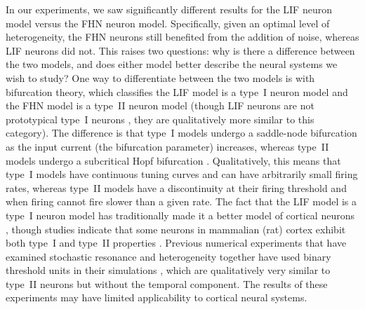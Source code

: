\documentclass[letterpaper,11pt]{article}
\begin{document}
In our experiments, we saw significantly different results for the LIF neuron model versus the FHN neuron model. Specifically, given an optimal level of heterogeneity, the FHN neurons still benefited from the addition of noise, whereas LIF neurons did not. This raises two questions: why is there a difference between the two models, and does either model better describe the neural systems we wish to study? One way to differentiate between the two models is with bifurcation theory, which classifies the LIF model is a type~I neuron model and the FHN model is a type~II neuron model (though LIF neurons are not prototypical type~I neurons \citep{Mato2008}, they are qualitatively more similar to this category). The difference is that type~I models undergo a saddle-node bifurcation as the input current (the bifurcation parameter) increases, whereas type~II models undergo a subcritical Hopf bifurcation \citep{Mato2008}. Qualitatively, this means that type~I models have continuous tuning curves and can have arbitrarily small firing rates, whereas type~II models have a discontinuity at their firing threshold and when firing cannot fire slower than a given rate. The fact that the LIF model is a type~I neuron model has traditionally made it a better model of cortical neurons \citep{Koch1999}, though studies indicate that some neurons in mammalian (rat) cortex exhibit both type~I and type~II properties \citep{Tateno2004,Tsubo2007}. Previous numerical experiments that have examined stochastic resonance and heterogeneity together have used binary threshold units in their simulations \citep{Stocks2000,McDonnell2006}, which are qualitatively very similar to type~II neurons but without the temporal component. The results of these experiments may have limited applicability to cortical neural systems.
\end{document}
